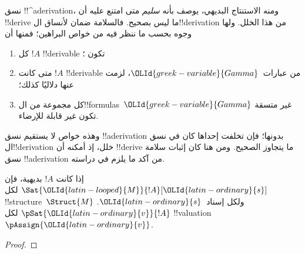 \documentclass[../../../include/open-logic-section]{subfiles}
\begin{document}
      {}
      {}


\begin{explain}
نسق !!^a{derivation}، ومنه الاستنتاج البديهي، يوصف بأنه \emph{سليم}
متى امتنع عليه أن !!{derive} ما ليس بصحيح. فالسلامة ضمان لأنساق
ال!!{derivation} من هذا الخلل. ولها وجوه بحسب ما ننظر فيه من خواص
البراهين؛ فمنها أن
\begin{enumerate}
\item كل $!A$ !!{derivable} تكون ؛
\item متى كانت $!A$ !!{derivable} من عبارات~${\OLId{greek-variable}{Gamma}}$، لزمت عنها
  دلاليًا كذلك؛
\item كل مجموعة من ال!!{formula}s~${\OLId{greek-variable}{Gamma}}$ غير متسقة تكون غير قابلة
  للإرضاء.
\end{enumerate}
وهذه خواص لا يستقيم نسق !!a{derivation} بدونها؛ فإن تخلفت إحداها
كان في نسق ال!!{derivation} خلل، إذ أمكنه أن !!{derive} ما يتجاوز
الصحيح. ومن هنا كان إثبات سلامة نسق !!a{derivation} من آكد ما يلزم
في دراسته.
\end{explain}

\begin{prop}
  إذا كانت $!A$ بديهية، فإن
    {$\Sat{{\OLId{latin-looped}{M}}}{!A}[{\OLId{latin-ordinary}{s}}]$ لكل !!{structure}~$\Struct{M}$ ولكل إسناد~${\OLId{latin-ordinary}{s}}$.}
    {$\pSat{{\OLId{latin-ordinary}{v}}}{!A}$ لكل !!{valuation}~$\pAssign{{\OLId{latin-ordinary}{v}}}$.}
\end{prop}

\begin{proof}
\end{proof}
\end{document}
